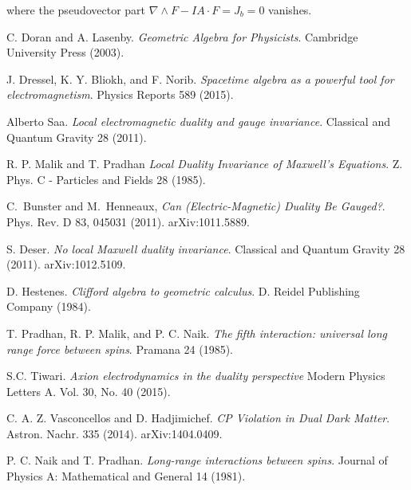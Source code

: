 \documentclass{article}
\begin{document}
  where the pseudovector part $\nabla \wedge F - I A \cdot F = J_b = 0$ vanishes.

  \begin{thebibliography}{9} 
      C. Doran and A. Lasenby.
      \emph{Geometric Algebra for Physicists}. Cambridge University Press (2003).

      J. Dressel, K. Y. Bliokh, and F. Norib.
      \emph{Spacetime algebra as a powerful tool for electromagnetism}.
      Physics Reports 589 (2015).

      Alberto Saa.
      \emph{Local electromagnetic duality and gauge invariance}.
      Classical and Quantum Gravity 28 (2011).

      R. P. Malik and T. Pradhan 
      \emph{Local Duality Invariance of Maxwell's Equations}.
      Z. Phys. C - Particles and Fields 28 (1985).

      C.~Bunster and M.~Henneaux,
        \emph{Can (Electric-Magnetic) Duality Be Gauged?}.
        Phys. Rev. D 83, 045031 (2011).
        arXiv:1011.5889.

        S. Deser.
        \emph{No local Maxwell duality invariance}.
        Classical and Quantum Gravity
        28 (2011).
        arXiv:1012.5109.

      D. Hestenes.
      \emph{Clifford algebra to geometric calculus}.
      D. Reidel Publishing Company (1984).

      T. Pradhan, R. P. Malik, and P. C. Naik.
      \emph{The fifth interaction: universal long range force between spins}.
      Pramana 24 (1985). 

      S.C. Tiwari.
      \emph{Axion electrodynamics in the duality perspective}
      Modern Physics Letters A.
      Vol. 30, No. 40 (2015).

      C. A. Z. Vasconcellos and D. Hadjimichef.
      \emph{CP Violation in Dual Dark Matter}.
      Astron. Nachr. 335 (2014).
      arXiv:1404.0409.

      P. C. Naik and T. Pradhan.
      \emph{Long-range interactions between spins}.
      Journal of Physics A: Mathematical and General 14 (1981).

  \end{thebibliography}
\end{document}
